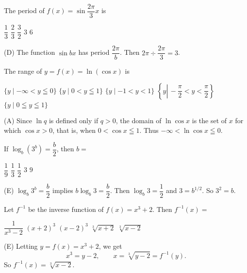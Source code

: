 \newpage



\question
The period of $f(x)=\sin \dfrac{2 \pi}{3} x$ is
\begin{choices}
  \choice $\dfrac{1}{3}$
  \choice $\dfrac{2}{3}$
  \choice $\dfrac{3}{2}$
  \CorrectChoice $3$
  \choice $6$
\end{choices}
\begin{solution}
(D) The function $\sin b x$ has period $\dfrac{2 \pi}{b}$. Then $2 \pi \div \dfrac{2 \pi}{3}=3$.
\end{solution}

\question
The range of $y=f(x)=\ln (\cos x)$ is
\begin{choices}
  \CorrectChoice $\{y \mid-\infty<y \leqq 0\}$
  \choice $\{y \mid 0<y \leqq 1\}$
  \choice $\{y \mid-1<y<1\}$
  \choice $\left\{y \left\lvert\,-\dfrac{\pi}{2}<y<\dfrac{\pi}{2}\right.\right\}$
  \choice $\{y \mid 0 \leqq y \leqq 1\}$
\end{choices}
\begin{solution}
(A) Since $\ln q$ is defined only if $q>0$, the domain of $\ln \cos x$ is the set of $x$ for which $\cos x>0$, that is, when $0<\cos x \leqq 1$. Thus $-\infty<\ln \cos x \leqq 0$.
\end{solution}

\question
If $\log_{b}\left(3^{b}\right)=\dfrac{b}{2}$, then $b=$
\begin{choices}
  \choice $\dfrac{1}{9}$
  \choice $\dfrac{1}{3}$
  \choice $\dfrac{1}{2}$
  \choice $3$
  \CorrectChoice $9$
\end{choices}
\begin{solution}
(E) $\log_{b} 3^{b}=\dfrac{b}{2}$ implies $b \log_{b} 3=\dfrac{b}{2}$. Then $\log_{b} 3=\dfrac{1}{2}$ and $3=b^{1 / 2}$. So $3^{2}=b$.
\end{solution}





\newpage



\question
Let $f^{-1}$ be the inverse function of $f(x)=x^{3}+2$. Then $f^{-1}(x)=$
\begin{choices}
  \choice $\dfrac{1}{x^{3}-2}$
  \choice $(x+2)^{3}$
  \choice $(x-2)^{3}$
  \choice $\sqrt[3]{x+2}$
  \CorrectChoice $\sqrt[3]{x-2}$
\end{choices}
\begin{solution}
(E) Letting $y=f(x)=x^{3}+2$, we get
\[
x^{3}=y-2,\qquad x=\sqrt[3]{y-2}=f^{-1}(y).
\]
So $f^{-1}(x)=\sqrt[3]{x-2}$.
\end{solution}

